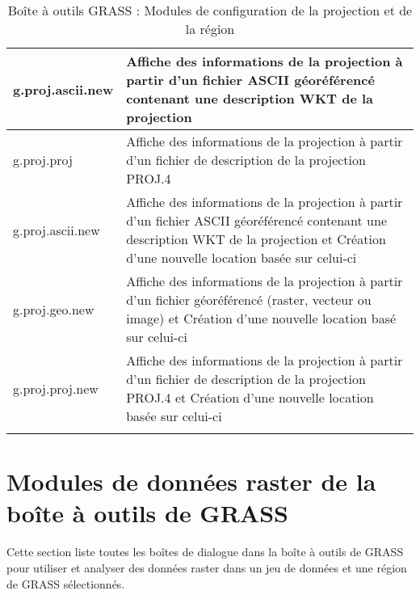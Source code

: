 \begin{center}
{\begin{longtable}{|p{2.5cm}|p{11.5cm}|}
  \hline g.proj.ascii.new & Affiche des informations de la projection à partir d'un fichier ASCII géoréférencé contenant une description WKT de la projection\\
  \hline g.proj.proj & Affiche des informations de la projection à partir d'un fichier de description de la projection PROJ.4 \\
  \hline g.proj.ascii.new & Affiche des informations de la projection à partir d'un fichier ASCII géoréférencé contenant une description WKT de la projection et Création d'une nouvelle location basée sur celui-ci \\
  \hline g.proj.geo.new &  Affiche des informations de la projection à partir d'un fichier géoréférencé (raster, vecteur ou image) et Création d'une nouvelle location basé sur celui-ci \\
  \hline g.proj.proj.new & Affiche des informations de la projection à partir d'un fichier de description de la projection PROJ.4 et Création d'une nouvelle location basée sur celui-ci \\
\hline
\caption{Boîte à outils GRASS : Modules de configuration de la projection et de la région}
\end{longtable}}
\end{center}

\section{Modules de données raster de la boîte à outils de GRASS}

Cette section liste toutes les boîtes de dialogue dans la boîte à outils de GRASS pour utiliser et analyser des données raster dans un jeu de données et une région de GRASS sélectionnés.

